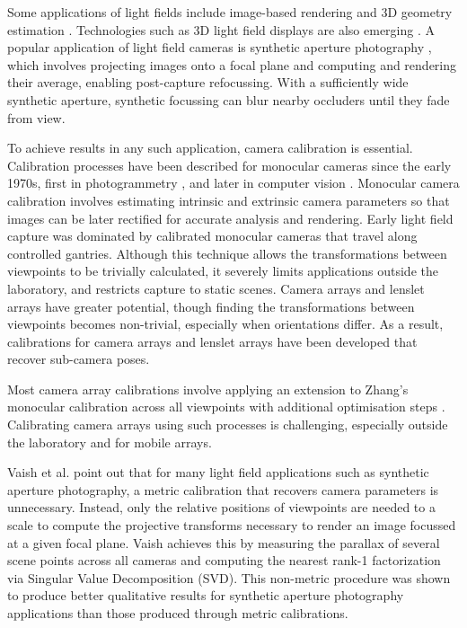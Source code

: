 \documentclass{article} \usepackage{acra}
\begin{document}

Some applications of light fields include image-based rendering
\cite{levoy_light_2006} and 3D geometry estimation
\cite{wanner2014variational}. Technologies such as 3D light field displays are
also emerging \cite{chen2014wide}. A popular application of light field cameras
is synthetic aperture photography \cite{levoy2004synthetic}, which involves
projecting images onto a focal plane and computing and rendering their average,
enabling post-capture refocussing. With a sufficiently wide synthetic aperture,
synthetic focussing can blur nearby occluders until they fade from view.


To achieve results in any such application, camera calibration is
essential. Calibration processes have been described for monocular cameras since
the early 1970s, first in photogrammetry \cite{duane1971close}, and later in
computer vision \cite{ganapathy_decomposition_1984}. Monocular camera
calibration involves estimating intrinsic and extrinsic camera parameters so
that images can be later rectified for accurate analysis and rendering. Early
light field capture was dominated by calibrated monocular cameras that travel
along controlled gantries. Although this technique allows the transformations
between viewpoints to be trivially calculated, it severely limits applications
outside the laboratory, and restricts capture to static scenes. Camera arrays
and lenslet arrays have greater potential, though finding the transformations
between viewpoints becomes non-trivial, especially when orientations differ. As
a result, calibrations for camera arrays and lenslet arrays have been developed
that recover sub-camera poses.


Most camera array calibrations involve applying an extension to Zhang's
monocular calibration  across all viewpoints with
additional optimisation steps
\cite{ueshiba_planebased_2003,xumobile2014}. Calibrating camera arrays using
such processes is challenging, especially outside the laboratory and for mobile
arrays.


Vaish et al.  point out that for many light field
applications such as synthetic aperture photography, a metric calibration that
recovers camera parameters is unnecessary. Instead, only the relative positions
of viewpoints are needed to a scale to compute the projective transforms
necessary to render an image focussed at a given focal plane. Vaish achieves
this by measuring the parallax of several scene points across all cameras and
computing the nearest rank-1 factorization via Singular Value Decomposition
(SVD). This non-metric procedure was shown to produce better qualitative results
for synthetic aperture photography applications than those produced through
metric calibrations.
\end{document}
